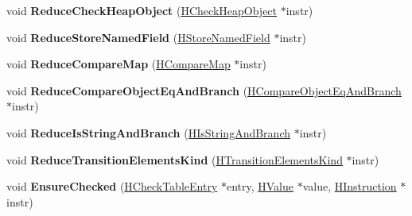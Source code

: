 \begin{DoxyCompactItemize}
\item 
void {\bfseries Reduce\+Check\+Heap\+Object} (\hyperlink{classv8_1_1internal_1_1_h_check_heap_object}{H\+Check\+Heap\+Object} $\ast$instr)\hypertarget{classv8_1_1internal_1_1_h_check_table_a3e1f388b7825653fd4bffb6d9416afb0}{}\label{classv8_1_1internal_1_1_h_check_table_a3e1f388b7825653fd4bffb6d9416afb0}

\item 
void {\bfseries Reduce\+Store\+Named\+Field} (\hyperlink{classv8_1_1internal_1_1_h_store_named_field}{H\+Store\+Named\+Field} $\ast$instr)\hypertarget{classv8_1_1internal_1_1_h_check_table_a7cd1440fdc18584af6a784defe3d54d8}{}\label{classv8_1_1internal_1_1_h_check_table_a7cd1440fdc18584af6a784defe3d54d8}

\item 
void {\bfseries Reduce\+Compare\+Map} (\hyperlink{classv8_1_1internal_1_1_h_compare_map}{H\+Compare\+Map} $\ast$instr)\hypertarget{classv8_1_1internal_1_1_h_check_table_a5066df19292895fb47c92dd51a16d988}{}\label{classv8_1_1internal_1_1_h_check_table_a5066df19292895fb47c92dd51a16d988}

\item 
void {\bfseries Reduce\+Compare\+Object\+Eq\+And\+Branch} (\hyperlink{classv8_1_1internal_1_1_h_compare_object_eq_and_branch}{H\+Compare\+Object\+Eq\+And\+Branch} $\ast$instr)\hypertarget{classv8_1_1internal_1_1_h_check_table_a083c4dccc0fdaa518af0846074a42e8e}{}\label{classv8_1_1internal_1_1_h_check_table_a083c4dccc0fdaa518af0846074a42e8e}

\item 
void {\bfseries Reduce\+Is\+String\+And\+Branch} (\hyperlink{classv8_1_1internal_1_1_h_is_string_and_branch}{H\+Is\+String\+And\+Branch} $\ast$instr)\hypertarget{classv8_1_1internal_1_1_h_check_table_a24f3d09a4d8ff3d4d87ac944a5dd3bbf}{}\label{classv8_1_1internal_1_1_h_check_table_a24f3d09a4d8ff3d4d87ac944a5dd3bbf}

\item 
void {\bfseries Reduce\+Transition\+Elements\+Kind} (\hyperlink{classv8_1_1internal_1_1_h_transition_elements_kind}{H\+Transition\+Elements\+Kind} $\ast$instr)\hypertarget{classv8_1_1internal_1_1_h_check_table_a850a5cdaeb6acfa7542e0d1f6d8bcda0}{}\label{classv8_1_1internal_1_1_h_check_table_a850a5cdaeb6acfa7542e0d1f6d8bcda0}

\item 
void {\bfseries Ensure\+Checked} (\hyperlink{structv8_1_1internal_1_1_h_check_table_entry}{H\+Check\+Table\+Entry} $\ast$entry, \hyperlink{classv8_1_1internal_1_1_h_value}{H\+Value} $\ast$value, \hyperlink{classv8_1_1internal_1_1_h_instruction}{H\+Instruction} $\ast$instr)\hypertarget{classv8_1_1internal_1_1_h_check_table_a044fef0428da53a6d4121e4431d04689}{}\label{classv8_1_1internal_1_1_h_check_table_a044fef0428da53a6d4121e4431d04689}


\end{DoxyCompactItemize}

